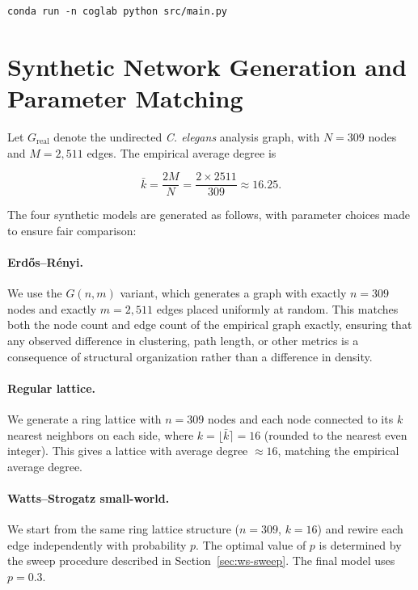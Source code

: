 \documentclass[12pt,a4paper]{report}
\begin{document}
\begin{verbatim}
conda run -n coglab python src/main.py
\end{verbatim}

\section{Synthetic Network Generation and Parameter Matching}
\label{sec:synthetic-generation}

Let $G_{\text{real}}$ denote the undirected \textit{C. elegans} analysis graph, with $N = 309$ nodes and $M = 2{,}511$ edges. The empirical average degree is

\begin{equation}
\bar{k} = \frac{2M}{N} = \frac{2 \times 2511}{309} \approx 16.25.
\end{equation}

The four synthetic models are generated as follows, with parameter choices made to ensure fair comparison:

\paragraph{Erd\H{o}s--R\'{e}nyi.} We use the $G(n, m)$ variant, which generates a graph with exactly $n = 309$ nodes and exactly $m = 2{,}511$ edges placed uniformly at random. This matches both the node count and edge count of the empirical graph exactly, ensuring that any observed difference in clustering, path length, or other metrics is a consequence of structural organization rather than a difference in density.

\paragraph{Regular lattice.} We generate a ring lattice with $n = 309$ nodes and each node connected to its $k$ nearest neighbors on each side, where $k = \lfloor \bar{k} \rceil = 16$ (rounded to the nearest even integer). This gives a lattice with average degree $\approx 16$, matching the empirical average degree.

\paragraph{Watts--Strogatz small-world.} We start from the same ring lattice structure ($n = 309$, $k = 16$) and rewire each edge independently with probability $p$. The optimal value of $p$ is determined by the sweep procedure described in Section~\ref{sec:ws-sweep}. The final model uses $p = 0.3$.
\end{document}
